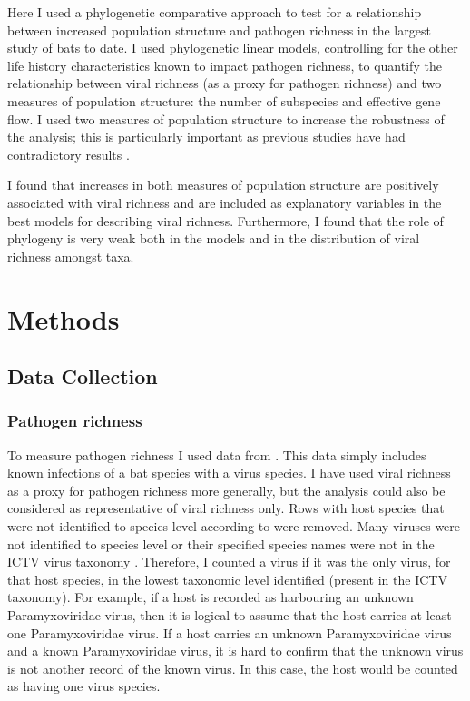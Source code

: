 Here I used a phylogenetic comparative approach to test for a relationship between increased population structure and pathogen richness in the largest study of bats to date. 
I used phylogenetic linear models, controlling for the other life history characteristics known to impact pathogen richness, to quantify the relationship between viral richness (as a proxy for pathogen richness) and two measures of population structure: the number of subspecies and effective gene flow. 
I used two measures of population structure to increase the robustness of the analysis; this is particularly important as previous studies have had contradictory results \cite{maganga2014bat, gay2014parasite, turmelle2009correlates}.

I found that increases in both measures of population structure are positively associated with viral richness and are included as explanatory variables in the best models for describing viral richness.
Furthermore, I found that the role of phylogeny is very weak both in the models and in the distribution of viral richness amongst taxa.



\section{Methods}



\subsection{Data Collection}

\subsubsection{Pathogen richness}

To measure pathogen richness I used data from \textcite{luis2013comparison}. 
This data simply includes known infections of a bat species with a virus species. 
I have used viral richness as a proxy for pathogen richness more generally, but the analysis could also be considered as representative of viral richness only.
Rows with host species that were not identified to species level according to \textcite{wilson2005mammal} were removed.
Many viruses were not identified to species level or their specified species names were not in the ICTV virus taxonomy \cite{ICTV}.
Therefore, I counted a virus if it was the only virus, for that host species, in the lowest taxonomic level identified (present in the ICTV taxonomy).
For example, if a host is recorded as harbouring an unknown Paramyxoviridae virus, then it is logical to assume that the host carries at least one Paramyxoviridae virus.
If a host carries an unknown Paramyxoviridae virus and a known Paramyxoviridae virus, it is hard to confirm that the unknown virus is not another record of the known virus.
In this case, the host would be counted as having one virus species.


